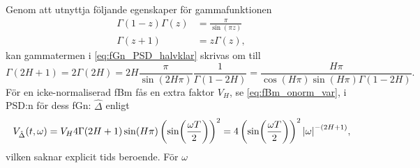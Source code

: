 Genom att utnyttja följande egenskaper för gammafunktionen
\begin{align}
    \Gamma(1-z)\Gamma(z)&=\frac{\pi}{\sin(\pi z)} \\
    \Gamma(z+1)&=z\Gamma(z),
\end{align}
kan gammatermen i \eqref{eq:fGn_PSD_halvklar} skrivas om till
\begin{equation}
    \Gamma(2H+1) = 2 \Gamma(2H) = 2H\frac{\pi}{\sin(2H\pi)}\frac{1}{\Gamma(1-2H)} = \frac{H\pi}{\cos(H\pi)\sin(H\pi)\Gamma(1-2H)}.
\end{equation}
För en icke-normaliserad fBm fås en extra faktor $V_H$, se \eqref{eq:fBm_onorm_var}, i PSD:n för dess fGn: $\hat{\Delta}$ enligt
\begin{equation}
    V_{\hat{\Delta}}(t,\omega) = V_H 4\Gamma{(2H+1)}\sin(H\pi) \left( \sin(\frac{\omega T}{2}) \right) ^2 = 4 \left( \sin(\frac{\omega T}{2}) \right) ^2\abs{\omega}^{-(2H+1)},
\end{equation}
vilken saknar explicit tids beroende. För $\omega$






